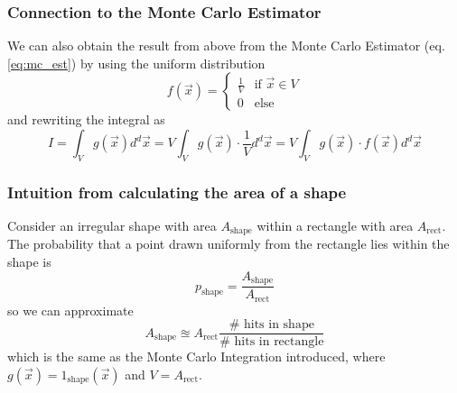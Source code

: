 

\subsubsection{Connection to the Monte Carlo Estimator}
We can also obtain the result from above
from the Monte Carlo Estimator (eq. \ref{eq:mc_est}) by using the uniform distribution
\begin{equation}
    f(\vec{x}) = \begin{cases}
        \frac{1}{V} & \text{if } \vec{x} \in V \\
        0 & \text{else}
    \end{cases}
\end{equation}
and rewriting the integral as
\begin{equation}
    I = \int_{V} g(\vec{x}) d^d \vec{x} = V \int_{V} g(\vec{x}) \cdot \frac{1}{V} d^d \vec{x} = V \int_{V} g(\vec{x}) \cdot f(\vec{x}) d^d \vec{x}
\end{equation}

\subsubsection{Intuition from calculating the area of a shape}
Consider an irregular shape with area $A_{\text{shape}}$ within a rectangle with area $A_{\text{rect}}$. 
The probability that a point drawn uniformly from the rectangle lies within the shape is 
\begin{equation}
    p_{\text{shape}} = \frac{A_{\text{shape}}}{A_{\text{rect}}}
\end{equation}
so we can approximate
\begin{equation}
    A_{\text{shape}}\approxeq A_{\text{rect}} \frac{\# \text{ hits in shape}}{\# \text{ hits in rectangle}}
\end{equation}
which is the same as the Monte Carlo Integration introduced, where $g(\vec{x}) = 1_{\text{shape}}(\vec{x})$ and $V = A_{\text{rect}}$.

